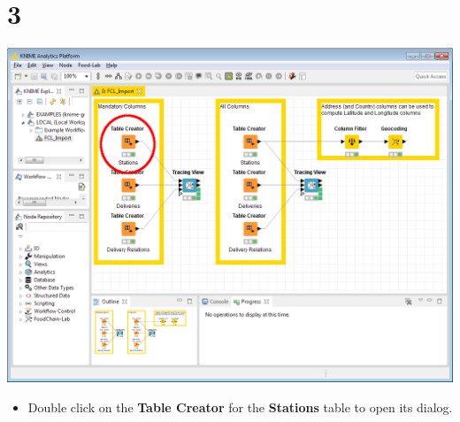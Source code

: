 \documentclass[10pt]{beamer}
\begin{document}
\section{3}
\begin{frame}
	\begin{center}
  		\includegraphics[height=0.6\textheight]{3.png}
	\end{center}
	\begin{itemize}
		\item Double click on the \textbf{Table Creator} for the \textbf{Stations} table to open its dialog.
	\end{itemize}
\end{frame}
\end{document}
